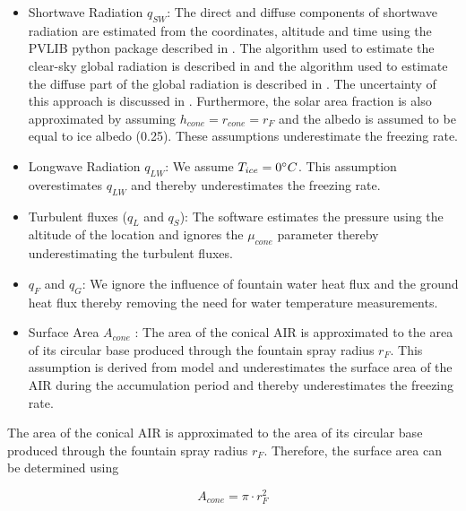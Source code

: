\documentclass[tc, manuscript]{copernicus}
\begin{document}
\begin{itemize}

  \item Shortwave Radiation $q_{SW}$: The direct and diffuse components of shortwave radiation are estimated from the coordinates,
    altitude and time using the PVLIB python package described in \cite{holmgrenPvlibPythonPython2018} . The
    algorithm used to estimate the clear-sky global radiation is described in
    \cite{ineichenBroadbandSimplifiedVersion2008} and the algorithm used to estimate the diffuse part of the
    global radiation is described in \cite{erbsEstimationDiffuseRadiation1982}. The uncertainty of this approach
    is discussed in \cite{ineichenValidationModelsThat2016}. Furthermore, the solar area fraction is also
    approximated by assuming $h_{cone} = r_{cone} = r_{F}$ and the albedo is assumed to be equal to ice albedo
    (0.25). These assumptions underestimate the freezing rate.

  \item Longwave Radiation $q_{LW}$: We assume $T_{ice} = 0 ^{\circ} C$. This assumption overestimates $q_{LW}$
    and thereby underestimates the freezing rate.

  \item Turbulent fluxes ($q_{L}$ and $q_{S}$): The software estimates the pressure using the altitude of the
    location and ignores the $\mu_{cone}$ parameter thereby underestimating the turbulent fluxes.

  \item $q_{F}$ and $q_{G}$: We ignore the influence of fountain water heat flux and the ground heat flux
    thereby removing the need for water temperature measurements.

  \item Surface Area $A_{cone}$ : The area of the conical AIR is approximated to the area of its circular base
    produced through the fountain spray radius $r_F$. This assumption is derived from
    \cite{oerlemansBriefCommunicationGrowth2021} model and underestimates the surface area of the AIR during the
    accumulation period and thereby underestimates the freezing rate.

\end{itemize}

The area of the conical AIR is approximated to the area of its circular base produced through the fountain spray
radius $r_F$. Therefore, the surface area can be determined using

\begin{equation} A_{cone} =\pi \cdot r_{F}^2 \label{eq:Area} \end{equation}
\end{document}
